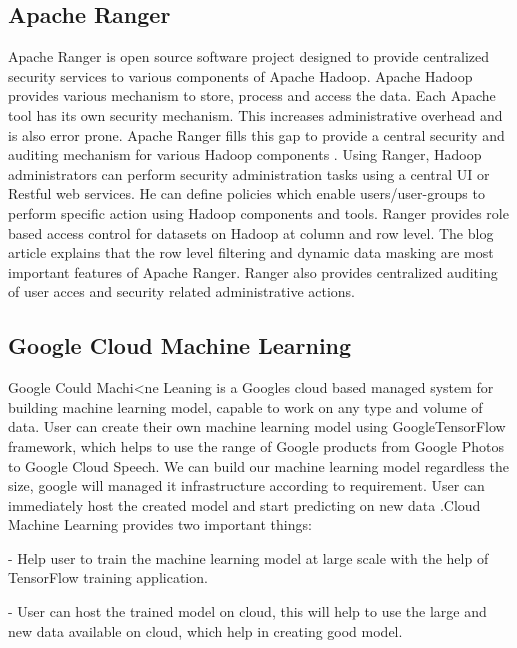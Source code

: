 \subsection{Apache Ranger}

     Apache Ranger \cite{www-apache-ranger} is open source software project
     designed to provide centralized security services to various components
     of Apache Hadoop. Apache Hadoop provides various mechanism to store,
     process and access the data. Each Apache tool has its own security
     mechanism. This increases administrative overhead and is also error
     prone.  Apache Ranger fills this gap to provide a central security and
     auditing mechanism for various Hadoop components
     \cite{www-ranger-architecture}. Using Ranger, Hadoop administrators can
     perform security administration tasks using a central UI or Restful web
     services. He can define policies which enable users/user-groups to
     perform specific action using Hadoop components and tools. Ranger
     provides role based access control for datasets on Hadoop at column and
     row level.  The blog article \cite{www-ranger-key-features} explains
     that the row level filtering and dynamic data masking are most important
     features of Apache Ranger. Ranger also provides centralized auditing of
     user acces and security related administrative actions.
     
\subsection{Google Cloud Machine Learning}
     
     Google Could Machi<ne Leaning is a Googles cloud based managed
     system for building machine learning model, capable to work on any
     type and volume of data. User can create their own machine learning
     model using GoogleTensorFlow framework, which helps to use the
     range of Google products from Google Photos to Google Cloud Speech.
     We can build our machine learning model regardless the size, google
     will managed it infrastructure according to  requirement. User can
     immediately host the created model and start predicting on new data
     \cite{www-googlecloudmachinelearning}.Cloud Machine Learning provides
     two important things:
     
     - Help user to train the machine learning model at large scale
       with the help of TensorFlow  training application.
	
     - User can host the trained model on cloud,  this will help
       to use the large and new data available on cloud, which help in
       creating good model.

